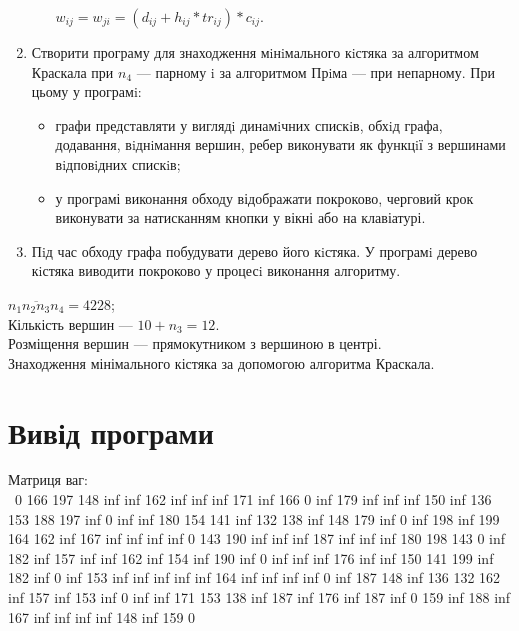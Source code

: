\begin{enumerate}
\begin{enumerate}
        $w_{ij} = w_{ji} = \left(d_{ij} + h_{ij} * tr_{ij}\right) * c_{ij}$.
    \end{enumerate}
  \item Створити програму для знаходження мiнiмального кiстяка за алгоритмом Краскала при $n_4$ — парному i за алгоритмом Прiма — при непарному.
    При цьому у програмi:
    \begin{itemize}
      \item графи представляти у виглядi динамiчних спискiв, обхiд графа, додавання, вiднiмання вершин, ребер виконувати як функцiї з вершинами вiдповiдних спискiв;
      \item у програмі виконання обходу відображати покроково, черговий крок виконувати за натисканням кнопки у вікні або на клавіатурі.
    \end{itemize}
  \item Пiд час обходу графа побудувати дерево його кiстяка. У програмi дерево кiстяка виводити покроково у процесi виконання алгоритму.
\end{enumerate}

\taskspec%
$\overline{n_1 n_2 n_3 n_4} = 4228$;\\
Кількість вершин --- $10 + n_3 = 12$.\\
Розміщення вершин --- прямокутником з вершиною в центрі.\\
Знаходження мінімального кістяка за допомогою алгоритма Краскала.


\section{Вивід програми}

\begin{minipage}[t]{0.7\linewidth}
  \begin{center}
    \begin{framed}
      \noindent%
      Матриця ваг:\\
        {\ttfamily\obeyspaces\obeylines\footnotesize%
 \  0 166 197 148 inf inf 162 inf inf inf 171 inf
  166   0 inf 179 inf inf inf 150 inf 136 153 188
  197 inf   0 inf inf 180 154 141 inf 132 138 inf
  148 179 inf   0 inf 198 inf 199 164 162 inf 167
  inf inf inf inf   0 143 190 inf inf inf 187 inf
  inf inf 180 198 143   0 inf 182 inf 157 inf inf
  162 inf 154 inf 190 inf   0 inf inf inf 176 inf
  inf 150 141 199 inf 182 inf   0 inf 153 inf inf
  inf inf inf 164 inf inf inf inf   0 inf 187 148
  inf 136 132 162 inf 157 inf 153 inf   0 inf inf
  171 153 138 inf 187 inf 176 inf 187 inf   0 159
  inf 188 inf 167 inf inf inf inf 148 inf 159   0
        }
    \end{framed}
  \end{center}
\end{minipage}
\hfill
\vspace{1em}

